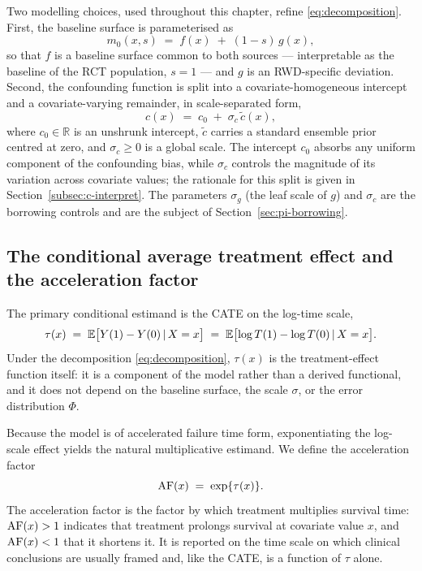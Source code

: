Two modelling choices, used throughout this chapter, refine
\eqref{eq:decomposition}. First, the baseline surface is parameterised as
\begin{equation}
\label{eq:m0-split}
m_0(x, s) \;=\; f(x) \;+\; (1 - s)\, g(x),
\end{equation}
so that $f$ is a baseline surface common to both sources --- interpretable as
the baseline of the RCT population, $s = 1$ --- and $g$ is an RWD-specific
deviation. Second, the confounding function is split into a
covariate-homogeneous intercept and a covariate-varying remainder, in
scale-separated form,
\begin{equation}
\label{eq:c-scale}
c(x) \;=\; c_0 \;+\; \sigma_c\,\tilde c(x),
\end{equation}
where $c_0 \in \mathbb{R}$ is an unshrunk intercept, $\tilde c$ carries a
standard ensemble prior centred at zero, and $\sigma_c \ge 0$ is a global scale.
The intercept $c_0$ absorbs any uniform component of the confounding bias, while
$\sigma_c$ controls the magnitude of its variation across covariate values; the
rationale for this split is given in Section~\ref{subsec:c-interpret}. The
parameters $\sigma_g$ (the leaf scale of $g$) and $\sigma_c$ are the borrowing
controls and are the subject of Section~\ref{sec:pi-borrowing}.

\subsection{The conditional average treatment effect and the acceleration factor}

The primary conditional estimand is the CATE on the log-time scale,
\begin{equation}
\label{eq:cate}
\tau(x) \;=\; \mathbb{E}\bigl[Y(1) - Y(0) \,\vert\, X = x\bigr]
        \;=\; \mathbb{E}\bigl[\log T(1) - \log T(0) \,\vert\, X = x\bigr].
\end{equation}
Under the decomposition \eqref{eq:decomposition}, $\tau(x)$ is the
treatment-effect function itself: it is a component of the model rather than a
derived functional, and it does not depend on the baseline surface, the scale
$\sigma$, or the error distribution $\Phi$.

Because the model is of accelerated failure time form, exponentiating the
log-scale effect yields the natural multiplicative estimand. We define the
acceleration factor
\begin{equation}
\label{eq:af}
\mathrm{AF}(x) \;=\; \exp\{\tau(x)\}.
\end{equation}
The acceleration factor is the factor by which treatment multiplies survival
time: $\mathrm{AF}(x) > 1$ indicates that treatment prolongs survival at covariate value
$x$, and $\mathrm{AF}(x) < 1$ that it shortens it. It is reported on the time scale on
which clinical conclusions are usually framed and, like the CATE, is a function
of $\tau$ alone.

